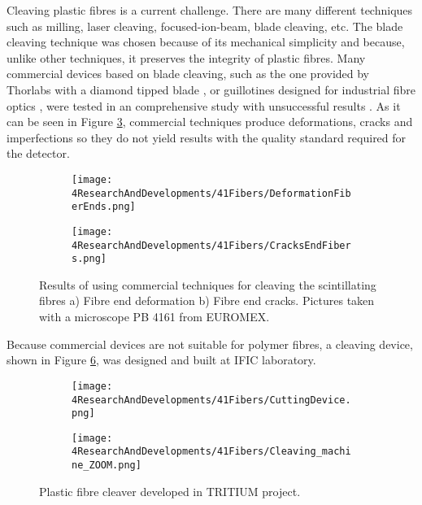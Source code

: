 Cleaving plastic fibres is a current challenge. There are many different techniques such as milling, laser cleaving, focused-ion-beam, blade cleaving, etc. The blade cleaving technique was chosen because of its mechanical simplicity and because, unlike other techniques, it preserves the integrity of plastic fibres. Many commercial devices based on blade cleaving, such as the one provided by Thorlabs with a diamond tipped blade \cite{DiamondThorlabs}, or guillotines designed for industrial fibre optics \cite{GuillotineIFO}, were tested in an comprehensive study with unsuccessful results \cite{TFGAlberto}. As it can be seen in Figure \ref{fig:BadCleavesOfFibers}, commercial techniques produce deformations, cracks and imperfections so they do not yield results with the quality standard required for the detector.
\begin{figure}
\centering
    \begin{subfigure}[b]{0.5\textwidth}
    \centering
    \texttt{[image: 4ResearchAndDevelopments/41Fibers/DeformationFiberEnds.png]}  
    \caption{\label{subfig:FiberEndDeformation}}
    \end{subfigure}
    \hfill
    \begin{subfigure}[b]{0.45\textwidth}
    \centering
    \texttt{[image: 4ResearchAndDevelopments/41Fibers/CracksEndFibers.png]}  
    \caption{\label{subfig:FiberEndCracks}}
    \end{subfigure}
 \caption{Results of using commercial techniques for cleaving the scintillating fibres a) Fibre end deformation b) Fibre end cracks. Pictures taken with a microscope PB 4161 from EUROMEX.}
 \label{fig:BadCleavesOfFibers}
\end{figure}
Because commercial devices are not suitable for polymer fibres, a cleaving device, shown in Figure \ref{fig:CleaveTRITIUMDevice}, was designed and built at IFIC laboratory.
\begin{figure}
\centering
    \begin{subfigure}[b]{0.5\textwidth}
    \centering
    \texttt{[image: 4ResearchAndDevelopments/41Fibers/CuttingDevice.png]}  
    \caption{\label{subfig:CleaveTRITIUMDevice1}}
    \end{subfigure}
    \hfill
    \begin{subfigure}[b]{0.45\textwidth}
    \centering
    \texttt{[image: 4ResearchAndDevelopments/41Fibers/Cleaving\_machine\_ZOOM.png]}  
    \caption{\label{subfig:CleaveTRITIUMDeviceZOOM}}
    \end{subfigure}
 \caption{Plastic fibre cleaver developed in TRITIUM project. \label{fig:CleaveTRITIUMDevice}}
\end{figure}
